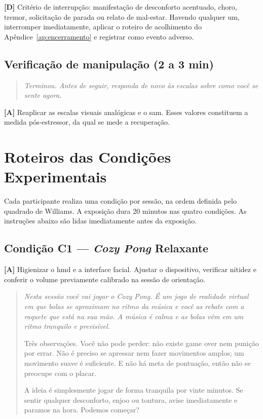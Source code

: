 \noindent\textbf{[D]} Critério de interrupção: manifestação de desconforto acentuado, choro, tremor, solicitação de parada ou relato de mal-estar. Havendo qualquer um, interromper imediatamente, aplicar o roteiro de acolhimento do Apêndice~\ref{ap:encerramento} e registrar como evento adverso.

\section*{Verificação de manipulação (2 a 3 min)}

\begin{quote}\itshape
Terminou. Antes de seguir, responda de novo às escalas sobre como você se sente \emph{agora}.
\end{quote}

\noindent\textbf{[A]} Reaplicar as escalas visuais analógicas e o \gls{sam}. Esses valores constituem a medida pós-estressor, da qual se mede a recuperação.

\chapter{Roteiros das Condições Experimentais}\label{ap:condicoes}

Cada participante realiza uma condição por sessão, na ordem definida pelo quadrado de Williams. A exposição dura 20 minutos nas quatro condições. As instruções abaixo são lidas imediatamente antes da exposição.

\section{Condição C1 --- \textit{Cozy Pong} Relaxante}

\noindent\textbf{[A]} Higienizar o \gls{hmd} e a interface facial. Ajustar o dispositivo, verificar nitidez e conferir o volume previamente calibrado na sessão de orientação.

\begin{quote}\itshape
Nesta sessão você vai jogar o \textit{Cozy Pong}. É um jogo de realidade virtual em que bolas se aproximam no ritmo da música e você as rebate com a raquete que está na sua mão. A música é calma e as bolas vêm em um ritmo tranquilo e previsível.

Três observações. Você não pode perder: não existe game over nem punição por errar. Não é preciso se apressar nem fazer movimentos amplos; um movimento suave é suficiente. E não há meta de pontuação, então não se preocupe com o placar.

A ideia é simplesmente jogar de forma tranquila por vinte minutos. Se sentir qualquer desconforto, enjoo ou tontura, avise imediatamente e paramos na hora. Podemos começar?
\end{quote}

